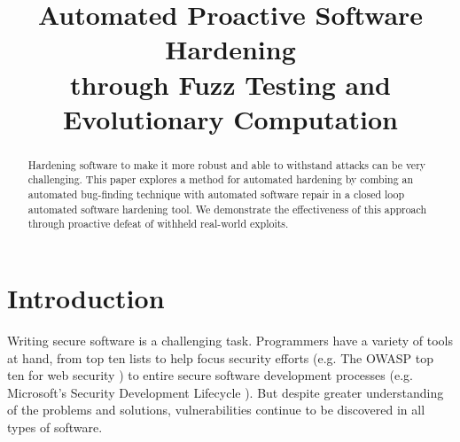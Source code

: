 \documentclass[conference]{IEEEtran}
\begin{document}
\title{Automated Proactive Software Hardening\\ through Fuzz Testing and Evolutionary Computation}

\author{}

\maketitle

\begin{abstract}
Hardening software to make it more robust and able to withstand attacks can be
very challenging.  This paper explores a method for automated hardening by
combing an automated bug-finding technique with automated software
repair in a closed loop automated software hardening tool.  We
demonstrate the effectiveness of this approach through proactive
defeat of withheld real-world exploits.
\end{abstract}

\section{Introduction}
Writing secure software is a challenging task.  Programmers have a variety of
tools at hand, from top ten lists to help focus security efforts (e.g. The OWASP
top ten for web security \cite{owasp_top_10_2013}) to entire secure
software development processes (e.g. Microsoft's Security Development Lifecycle
\cite{microsoft_sdl}).  But despite greater understanding of the problems and
solutions, vulnerabilities continue to be discovered in all types of software.
\end{document}

